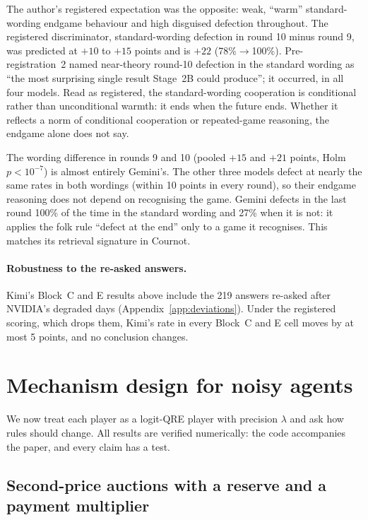 \documentclass[11pt]{article}
\theoremstyle{definition}
\theoremstyle{remark}
\newcommand{\lam}{\lambda}
\begin{document}
The author's registered expectation was the opposite: weak, ``warm'' standard-wording endgame behaviour and
high disguised defection throughout. The registered discriminator, standard-wording defection in round 10
minus round 9, was predicted at $+10$ to $+15$ points and is $+22$ (78\%$\to$100\%).
Pre-registration~2 named near-theory round-10 defection in the standard wording as ``the most
surprising single result Stage~2B could produce''; it occurred, in all four models. Read as registered, the standard-wording cooperation is conditional rather than unconditional
warmth: it ends when the future ends. Whether it reflects a norm of conditional cooperation or
repeated-game reasoning, the endgame alone does not say.

The wording difference in rounds 9 and 10 (pooled $+15$ and $+21$ points, Holm $p<10^{-7}$) is
almost entirely Gemini's. The other three models defect at nearly the same rates in both
wordings (within 10 points in every round), so their endgame reasoning does not depend on
recognising the game. Gemini defects in the last round 100\% of the time in the standard wording
and 27\% when it is not: it applies the folk rule ``defect at the end'' only to a game it
recognises. This matches its retrieval signature in Cournot.

\paragraph{Robustness to the re-asked answers.} Kimi's Block~C and E results above include the
219 answers re-asked after NVIDIA's degraded days (Appendix~\ref{app:deviations}). Under the
registered scoring, which drops them, Kimi's rate in every Block~C and E cell moves by at most
5 points, and no conclusion changes.


\section{Mechanism design for noisy agents}\label{sec:mechanism}

We now treat each player as a logit-QRE player with precision $\lam$ and ask how rules should
change. All results are verified numerically: the code accompanies the paper, and every claim
has a test.

\subsection{Second-price auctions with a reserve and a payment multiplier}
\end{document}
